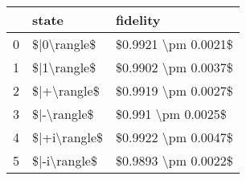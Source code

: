 \begin{tabular}{lll}
\toprule
{} &         state &             fidelity \\
\midrule
0 &   \$|0\textbackslash rangle\$ &  \$0.9921 \textbackslash pm 0.0021\$ \\
1 &   \$|1\textbackslash rangle\$ &  \$0.9902 \textbackslash pm 0.0037\$ \\
2 &   \$|+\textbackslash rangle\$ &  \$0.9919 \textbackslash pm 0.0027\$ \\
3 &   \$|-\textbackslash rangle\$ &   \$0.991 \textbackslash pm 0.0025\$ \\
4 &  \$|+i\textbackslash rangle\$ &  \$0.9922 \textbackslash pm 0.0047\$ \\
5 &  \$|-i\textbackslash rangle\$ &  \$0.9893 \textbackslash pm 0.0022\$ \\
\bottomrule
\end{tabular}
